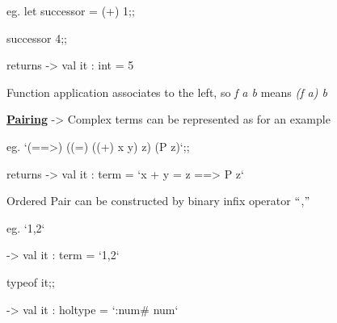 \documentclass[12pt]{article}
\renewcommand{\_}{\kern-1.5pt\textunderscore\kern-1.5pt}
\begin{document}
{\fontsize{13pt}{15.6pt}\selectfont eg. let successor = (+) 1;;\par}\par

{\fontsize{13pt}{15.6pt}\selectfont successor 4;;\par}\par

{\fontsize{13pt}{15.6pt}\selectfont returns -> val it : int = 5\par}\par


\vspace{\baselineskip}
{\fontsize{13pt}{15.6pt}\selectfont Function application associates to the left, so \textit{f a b} means \textit{(f a) b}\par}\par


\vspace{\baselineskip}
{\fontsize{13pt}{15.6pt}\selectfont \textbf{\uline{Pairing}} -> Complex terms can be represented as for an example\par}\par

{\fontsize{13pt}{15.6pt}\selectfont eg. `(==>) ((=) ((+) x y) z) (P z)`;;\par}\par

{\fontsize{13pt}{15.6pt}\selectfont returns -> val it : term = `x + y = z ==> P z`\par}\par


\vspace{\baselineskip}
{\fontsize{13pt}{15.6pt}\selectfont Ordered Pair can be constructed by binary infix operator $``$,$"$ \par}\par

{\fontsize{13pt}{15.6pt}\selectfont eg. `1,2`\par}\par

{\fontsize{13pt}{15.6pt}\selectfont -> val it : term = `1,2`\par}\par

{\fontsize{13pt}{15.6pt}\selectfont type\_of it;;\par}\par

{\fontsize{13pt}{15.6pt}\selectfont -> val it : hol\_type = `:num$\#$ num`\par}\par
\end{document}
